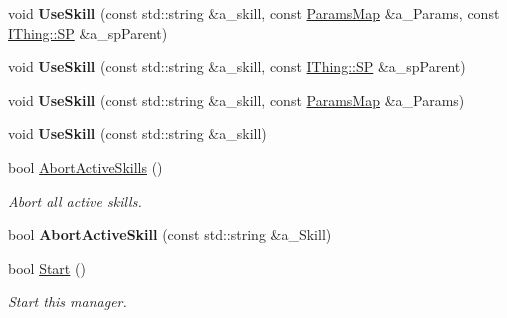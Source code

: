 \begin{DoxyCompactItemize}
\item 
\mbox{\label{class_skill_manager_a87fa23793bfdd49f8cb60877446395c1}} 
void {\bfseries Use\+Skill} (const std\+::string \&a\+\_\+skill, const \hyperlink{class_params_map}{Params\+Map} \&a\+\_\+\+Params, const \hyperlink{class_i_thing_a6e95654aef6362c48b9a2fd44a1f970a}{I\+Thing\+::\+SP} \&a\+\_\+sp\+Parent)
\item 
\mbox{\label{class_skill_manager_ae8bcd0cd97ad81b32cf5ce9afad27e68}} 
void {\bfseries Use\+Skill} (const std\+::string \&a\+\_\+skill, const \hyperlink{class_i_thing_a6e95654aef6362c48b9a2fd44a1f970a}{I\+Thing\+::\+SP} \&a\+\_\+sp\+Parent)
\item 
\mbox{\label{class_skill_manager_afbdf2abc030e5c3e6b849bfcf5ebab9e}} 
void {\bfseries Use\+Skill} (const std\+::string \&a\+\_\+skill, const \hyperlink{class_params_map}{Params\+Map} \&a\+\_\+\+Params)
\item 
\mbox{\label{class_skill_manager_a5670974dd172f0ba4ec3ebaa622332ba}} 
void {\bfseries Use\+Skill} (const std\+::string \&a\+\_\+skill)
\item 
\mbox{\label{class_skill_manager_ab6bf410f20b4e87ee2e85c46d32a1819}} 
bool \hyperlink{class_skill_manager_ab6bf410f20b4e87ee2e85c46d32a1819}{Abort\+Active\+Skills} ()
\begin{DoxyCompactList}\small\item\em Abort all active skills. \end{DoxyCompactList}\item 
\mbox{\label{class_skill_manager_a2fdc4a0701e2d352e3c7f3df44825c56}} 
bool {\bfseries Abort\+Active\+Skill} (const std\+::string \&a\+\_\+\+Skill)
\item 
\mbox{\label{class_skill_manager_ac5bd87257d3630c8e0c7bb5733682fbb}} 
bool \hyperlink{class_skill_manager_ac5bd87257d3630c8e0c7bb5733682fbb}{Start} ()
\begin{DoxyCompactList}\small\item\em Start this manager. \end{DoxyCompactList}\item 
\mbox{\label{class_skill_manager_a4a6e700c9c6cca9f07f65d16342a5907}} 

\end{DoxyCompactItemize}
